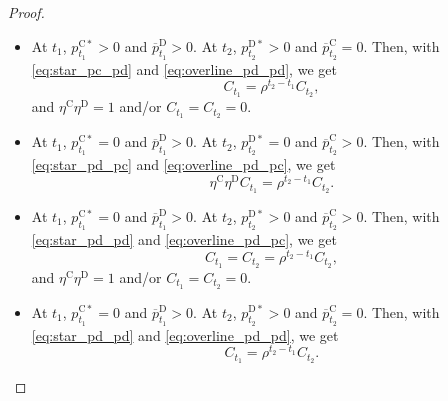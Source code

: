\documentclass[10pt,a4paper]{amsart}
\newcommand{\up}[1]{^{\mathrm{#1}}}
\begin{document}
\begin{proof}
\begin{itemize}
        \begin{equation} \label{eq:pc_pd_pd_pc}
            C_{t_1} =  \rho^{t_2 - t_1} C_{t_2},
        \end{equation}
        and $\eta\up{C} \eta\up{D} = 1$ and/or $C_{t_1} = C_{t_2} = 0$.
        \item At $t_1$, $p_{t_1}\up{C*}>0$ and $\overline{p}_{t_1}\up{D}>0$. At $t_2$, $p_{t_2}\up{D*}>0$ and $\overline{p}_{t_2}\up{C}=0$.
        Then, with \eqref{eq:star_pc_pd} and \eqref{eq:overline_pd_pd}, we get
        \begin{equation} \label{eq:pc_pd_pd_pd}
            C_{t_1} = \rho^{t_2 - t_1} C_{t_2},
        \end{equation}
        and $\eta\up{C} \eta\up{D} = 1$ and/or $C_{t_1} = C_{t_2} = 0$.
        \item At $t_1$, $p_{t_1}\up{C*}=0$ and $\overline{p}_{t_1}\up{D}>0$. At $t_2$, $p_{t_2}\up{D*}=0$ and $\overline{p}_{t_2}\up{C}>0$.
        Then, with \eqref{eq:star_pd_pc} and \eqref{eq:overline_pd_pc}, we get
        \begin{equation} \label{eq:pd_pc_pd_pc}
            \eta\up{C} \eta\up{D} C_{t_1} = \rho^{t_2 - t_1} C_{t_2}.
        \end{equation}
        \item At $t_1$, $p_{t_1}\up{C*}=0$ and $\overline{p}_{t_1}\up{D}>0$. At $t_2$, $p_{t_2}\up{D*}>0$ and $\overline{p}_{t_2}\up{C}>0$.
        Then, with \eqref{eq:star_pd_pd} and \eqref{eq:overline_pd_pc}, we get
        \begin{equation} \label{eq:pd_pd_pd_pc}
            C_{t_1} = C_{t_2} = \rho^{t_2 - t_1} C_{t_2},
        \end{equation}
        and $\eta\up{C} \eta\up{D} = 1$ and/or $C_{t_1} = C_{t_2} = 0$.
        \item At $t_1$, $p_{t_1}\up{C*}=0$ and $\overline{p}_{t_1}\up{D}>0$. At $t_2$, $p_{t_2}\up{D*}>0$ and $\overline{p}_{t_2}\up{C}=0$.
        Then, with \eqref{eq:star_pd_pd} and \eqref{eq:overline_pd_pd}, we get
        \begin{equation} \label{eq:pd_pd_pd_pd}
            C_{t_1} = \rho^{t_2 - t_1} C_{t_2}.
        \end{equation}
    \end{itemize}


\end{proof}
\end{document}
